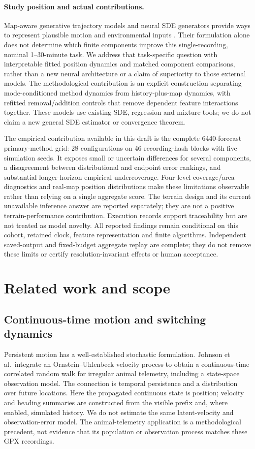 \documentclass[11pt]{article}
\begin{document}
\paragraph{Study position and actual contributions.}
Map-aware generative trajectory models and neural SDE generators provide
ways to represent plausible motion and environmental inputs
\cite{salzmann2020,kidger2021}. Their formulation alone does not determine
which finite components improve this single-recording, nominal 1--30-minute
task. We address that task-specific question with interpretable fitted
position dynamics and matched component comparisons, rather than a new
neural architecture or a claim of superiority to those external models.
The methodological contribution is an explicit construction separating
mode-conditioned method dynamics from history-plus-map dynamics, with
refitted removal/addition controls that remove dependent feature interactions
together. These models use existing SDE, regression and mixture tools;
we do not claim a new general SDE estimator or convergence theorem.

The empirical contribution available in this draft is the complete
6440-forecast primary-method grid: 28 configurations on 46 recording-hash
blocks with five simulation seeds. It exposes small or uncertain differences
for several components, a disagreement between distributional and endpoint
error rankings, and substantial longer-horizon empirical undercoverage.
Four-level coverage/area diagnostics and real-map position distributions make
these limitations observable rather than relying on a single aggregate score.
The terrain design and its current unavailable inference answer are reported
separately; they are not a positive terrain-performance contribution.
Execution records support traceability but are not treated as model novelty.
All reported findings remain conditional on this cohort, retained clock,
feature representation and finite algorithms. Independent saved-output and
fixed-budget aggregate replay are complete; they do not remove these limits
or certify resolution-invariant effects or human acceptance.

\section{Related work and scope}\label{sec:related-work}
\subsection{Continuous-time motion and switching dynamics}
Persistent motion has a well-established stochastic formulation. Johnson
et al.\ integrate an Ornstein--Uhlenbeck velocity process to obtain a
continuous-time correlated random walk for irregular animal telemetry,
including a state-space observation model\cite{johnson2008}. The connection
is temporal persistence and a distribution over future locations. Here the
propagated continuous state is position; velocity and heading summaries are
constructed from the visible prefix and, where enabled, simulated history.
We do not estimate the same latent-velocity and observation-error model.
The animal-telemetry application is a methodological precedent, not evidence
that its population or observation process matches these GPX recordings.
\end{document}
